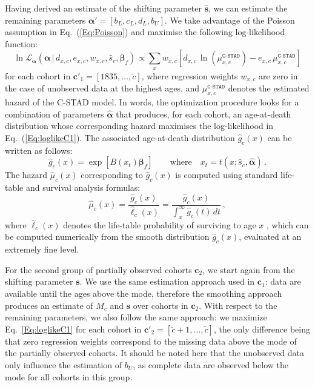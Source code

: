 \documentclass[11pt, a4paper]{article}
\begin{document}
Having derived an estimate of the shifting parameter $\hat{\bm{s}}$, we can estimate the remaining parameters $\bm{\alpha}'=\left[b_{L},c_{L},d_{L},b_{U}\right]$. We take advantage of the Poisson assumption in Eq.~(\ref{Eq:Poisson}) and maximise the following log-likelihood function:
%
\begin{equation}\label{Eq:loglikeC1}
\ln\mathcal{L}_{\bm{\alpha}}\left(\bm{\alpha}\,|\,d_{x,c} , e_{x,c} , w_{x,c} , \hat{s}_{c}, \bm{\beta}_{f}
\right) \propto \sum_{x} w_{x,c} \left[  d_{x,c} \,
\ln \left( \mu^{\texttt{C-STAD}}_{x,c}  \right) - e_{x,c}
\, \mu^{\texttt{C-STAD}}_{x,c} \right] 
\end{equation}
%
for each cohort in $\bm{c}'_1 = \left[1835,\dots,\breve{c}\right]$, where regression weights $w_{x,c}$ are zero in the case of unobserved data at the highest ages, and $\mu^{\texttt{C-STAD}}_{x,c}$ denotes the estimated hazard of the C-STAD model. In words, the optimization procedure looks for a combination of parameters $\hat{\bm{\alpha}}$ that produces, for each cohort, an age-at-death distribution whose corresponding hazard maximises the log-likelihood in Eq.~(\ref{Eq:loglikeC1}). The associated age-at-death distribution $\hat{g}_{c}(x)$ can be written as follows:
\begin{equation}\label{eq:gBspl}
\hat{g}_{c}(x) = \exp\left[ B(x_{t}) \bm{\beta}_{f} \right] \qquad \mbox{where} \quad x_{t} = t(x; \hat{s}_{c},\hat{\bm{\alpha}}) \, .
\end{equation}
The hazard $\hat{\mu}_c(x)$ corresponding to $\hat{g}_{c}(x)$ is computed using standard life-table and survival analysis formulas:
\begin{equation}\label{Eq:HazardCSTAD}
\hat{\mu}_c(x) = \frac{\hat{g}_c(x)}{\hat{\ell}_c(x)} = \frac{\hat{g}_c(x)}{\int_{x}^{\infty} \hat{g}_c(t)\,dt} \, ,
\end{equation}
where $\hat{\ell}_c(x)$ denotes the life-table probability of surviving to age $x$ \cite[i.e.~the survival function,][]{preston2001demogr,klein2003survival}, which can be computed numerically from the smooth distribution $\hat{g}_{c}(x)$, evaluated at an extremely fine level.

For the second group of partially observed cohorts $\bm{c}_2$, we start again from the shifting parameter $\bm{s}$. We use the same estimation approach used in $\bm{c}_1$: data are available until the ages above the mode, therefore the smoothing approach produces an estimate of $M_c$ and $\hat{\bm{s}}$ over cohorts in $\bm{c}_2$. With respect to the remaining parameters, we also follow the same approach: we maximize Eq.~\eqref{Eq:loglikeC1} for each cohort in $\bm{c}'_2=\left[\breve{c}+1,\ldots,\tilde{c}\right]$, the only difference being that zero regression weights correspond to the missing data above the mode of the partially observed cohorts. It should be noted here that the unobserved data only influence the estimation of $b_U$, as complete data are observed below the mode for all cohorts in this group. 
\end{document}
